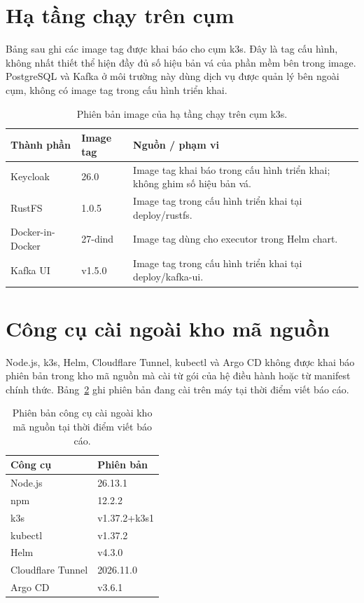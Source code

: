 \documentclass[../BTL.tex]{subfiles}
\begin{document}
\section{Hạ tầng chạy trên cụm}

Bảng sau ghi các image tag được khai báo cho cụm k3s. Đây là tag cấu hình, không nhất thiết thể hiện đầy đủ số hiệu bản vá của phần mềm bên trong image. PostgreSQL và Kafka ở môi trường này dùng dịch vụ được quản lý bên ngoài cụm, không có image tag trong cấu hình triển khai.

\begin{table}[H]
\centering
\small
\begin{tabularx}{\textwidth}{|p{3.4cm}|p{3.2cm}|X|}
\hline
Thành phần & Image tag & Nguồn / phạm vi \\ \hline
Keycloak & \textnormal{26.0} & Image tag khai báo trong cấu hình triển khai; không ghim số hiệu bản vá. \\ \hline
RustFS & \textnormal{1.0.5} & Image tag trong cấu hình triển khai tại \textnormal{deploy/rustfs}. \\ \hline
Docker-in-Docker & \textnormal{27-dind} & Image tag dùng cho executor trong Helm chart. \\ \hline
Kafka UI & \textnormal{v1.5.0} & Image tag trong cấu hình triển khai tại \textnormal{deploy/kafka-ui}. \\ \hline
\end{tabularx}
\caption{Phiên bản image của hạ tầng chạy trên cụm k3s.}
\label{tab:versions-infrastructure}
\end{table}

\section{Công cụ cài ngoài kho mã nguồn}

Node.js, k3s, Helm, Cloudflare Tunnel, kubectl và Argo CD không được khai báo phiên bản
trong kho mã nguồn mà cài từ gói của hệ điều hành hoặc từ manifest chính thức. Bảng~\ref{tab:versions-tools}
ghi phiên bản đang cài trên máy tại thời điểm viết báo cáo.

\begin{table}[H]
\centering
\small
\begin{tabular}{|p{7.5cm}|p{4.5cm}|}
\hline
Công cụ & Phiên bản \\ \hline
Node.js & 26.13.1 \\ \hline
npm & 12.2.2 \\ \hline
k3s & v1.37.2+k3s1 \\ \hline
kubectl & v1.37.2 \\ \hline
Helm & v4.3.0 \\ \hline
Cloudflare Tunnel & 2026.11.0 \\ \hline
Argo CD & v3.6.1 \\ \hline
\end{tabular}
\caption{Phiên bản công cụ cài ngoài kho mã nguồn tại thời điểm viết báo cáo.}
\label{tab:versions-tools}
\end{table}
\end{document}
